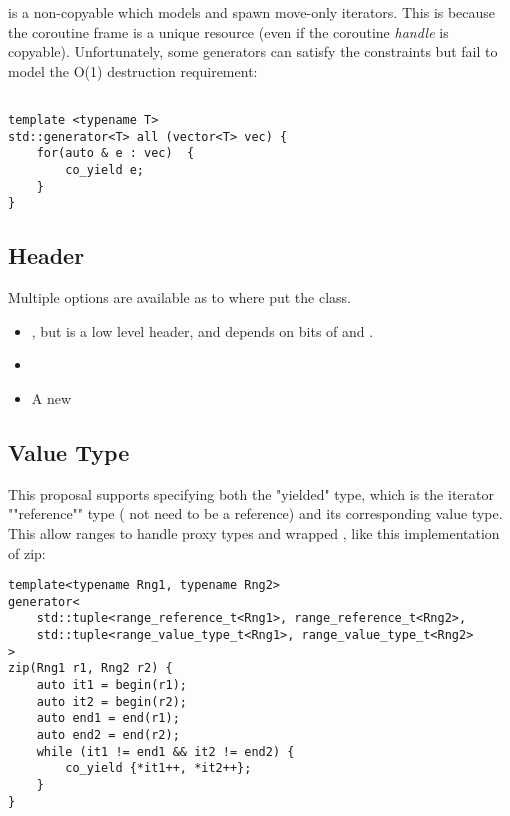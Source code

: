 \documentclass{wg21}
\begin{document}
 is a non-copyable  which models  and spawn move-only iterators.
This is because the coroutine frame is a unique resource (even if the coroutine \textit{handle} is copyable).
Unfortunately, some generators can satisfy the  constraints but fail to model the  O(1) 
destruction requirement:

\begin{lstlisting}[style=color]

template <typename T>
std::generator<T> all (vector<T> vec) {
    for(auto & e : vec)  {
        co_yield e;
    }
}

\end{lstlisting}



\subsection{Header}

Multiple options are available as to where put the  class.

\begin{itemize}
\item {}, but  is a low level header, and  depends on bits of  and .

\item {}

\item A new 

\end{itemize}

\subsection{Value Type}

This proposal supports specifying both the "yielded" type, which is the iterator ""reference"" type ( not need to be a reference) and its corresponding value type.
This allow ranges to handle proxy types and wrapped , like this implementation of zip:

\begin{lstlisting}[style=color]
template<typename Rng1, typename Rng2>
generator<
    std::tuple<range_reference_t<Rng1>, range_reference_t<Rng2>,
    std::tuple<range_value_type_t<Rng1>, range_value_type_t<Rng2>
>
zip(Rng1 r1, Rng2 r2) {
    auto it1 = begin(r1);
    auto it2 = begin(r2);
    auto end1 = end(r1);
    auto end2 = end(r2);
    while (it1 != end1 && it2 != end2) {
        co_yield {*it1++, *it2++};
    }
}
\end{lstlisting}
\end{document}
